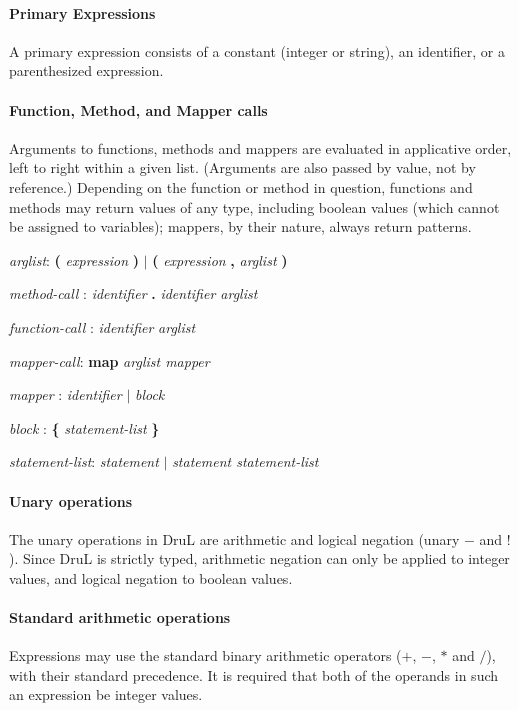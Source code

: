 \paragraph{Primary Expressions}

A primary expression consists of a constant (integer or string), an identifier, or a parenthesized expression.

\paragraph{Function, Method, and Mapper calls}

Arguments to functions, methods and mappers are evaluated in applicative order, left to right within a given list.  (Arguments are also passed by value, not by reference.)  Depending on the function or method in question, functions and methods may return values of any type, including boolean values (which cannot be assigned to variables); mappers, by their nature, always return patterns.

\emph{arglist}: \textbf ( \emph{expression} \textbf ) $|$  \textbf ( \emph{expression}
\textbf{,} \emph{arglist} \textbf )

\emph{method-call} : \emph{identifier} \textbf . \emph{identifier arglist}

\emph{function-call} : \emph{identifier} \emph{arglist}

\emph{mapper-call}:  \textbf{map} \emph{arglist mapper}

\emph{mapper} : \emph{identifier} $|$ \emph{block}

\emph{block} : \textbf{\{} \emph{statement-list} \textbf{\}}

\emph{statement-list}: \emph{statement} $|$ \emph{statement statement-list}

\paragraph{Unary operations}

The unary operations in DruL are arithmetic and logical negation (unary $-$ and $!$).  Since DruL is strictly typed, arithmetic negation can only be applied to integer values, and logical negation to boolean values.

\paragraph{Standard arithmetic operations}

Expressions may use the standard binary arithmetic operators ($+$, $-$, $*$ and $/$), with their standard precedence.  It is required that both of the operands in such an expression be integer values.

